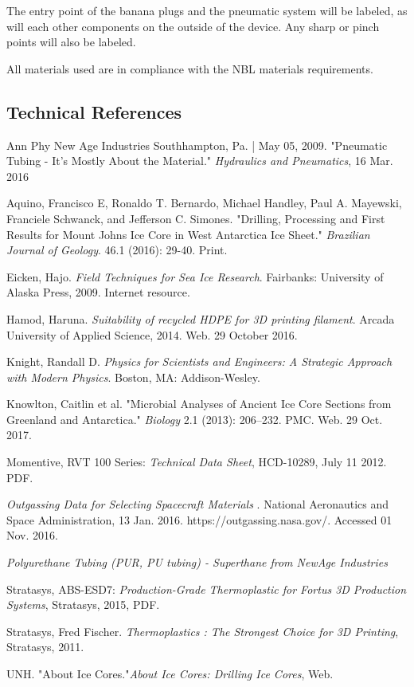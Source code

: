 \documentclass{article}
\begin{document}
The entry point of the banana plugs and the pneumatic system will be labeled, as will each other components on the outside of the device. Any sharp or pinch points will also be labeled.

All materials used are in compliance with the NBL materials requirements.


\subsection{Technical References}

\begin{thebibliography}{12}
Ann Phy New Age Industries Southhampton, Pa. | May 05, 2009. "Pneumatic Tubing - It's Mostly About the Material." \textit{Hydraulics and Pneumatics}, 16 Mar. 2016

Aquino, Francisco E, Ronaldo T. Bernardo, Michael Handley, Paul A. Mayewski, Franciele Schwanck, and Jefferson C. Simones. "Drilling, Processing and First Results for Mount Johns Ice Core in West Antarctica Ice Sheet." \textit{Brazilian Journal of Geology}. 46.1 (2016): 29-40. Print.

Eicken, Hajo. \textit{Field Techniques for Sea Ice Research}. Fairbanks: University of Alaska Press, 2009. Internet resource.

Hamod, Haruna. \textit{Suitability of recycled HDPE for 3D printing filament}. Arcada University of Applied Science, 2014. Web. 29 October 2016.

Knight, Randall D. \textit{Physics for Scientists and Engineers: A Strategic Approach with Modern Physics}. Boston, MA: Addison-Wesley.

Knowlton, Caitlin et al. "Microbial Analyses of Ancient Ice Core Sections from Greenland and Antarctica." \textit{Biology} 2.1 (2013): 206–232. PMC. Web. 29 Oct. 2017.

Momentive, RVT 100 Series: \textit{Technical Data Sheet}, HCD-10289, July 11 2012. PDF.

\textit{Outgassing Data for Selecting Spacecraft Materials} . National Aeronautics and Space Administration, 13 Jan. 2016. https://outgassing.nasa.gov/. Accessed 01 Nov. 2016.

\textit{Polyurethane Tubing (PUR, PU tubing) - Superthane from NewAge Industries}

Stratasys, ABS-ESD7: \textit{Production-Grade Thermoplastic for Fortus 3D Production Systems}, Stratasys, 2015, PDF.

Stratasys, Fred Fischer. \textit{Thermoplastics : The Strongest Choice for 3D Printing}, Stratasys, 2011.

UNH. "About Ice Cores."\textit{About Ice Cores: Drilling Ice Cores}, Web.

\end{thebibliography}
\end{document}
